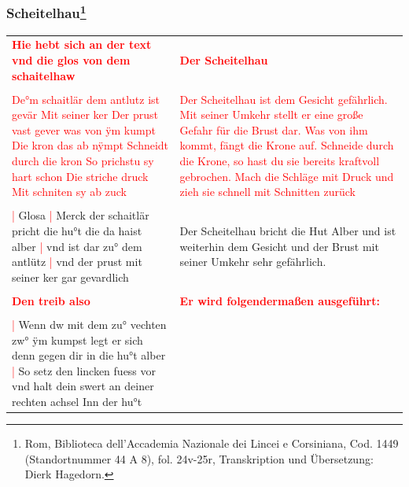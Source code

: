 \begin{center}
\end{center}

\newpage

\subsubsection[Scheitelhau]{
    Scheitelhau\footnote{
        \hspace*{0.5ex}Rom, Biblioteca dell'Accademia Nazionale dei Lincei e Corsiniana,
        Cod. 1449 (Standortnummer 44 A 8), fol. 24v-25r, Transkription und Übersetzung: Dierk Hagedorn.}}

\begin{longtable}{p{6.25cm}p{6.25cm}}
    \textbf{\textcolor{red}{
        Hie hebt sich an der text vnd die glos von dem schaitelhaw}}
    &
    \textbf{\textcolor{red}{
        Der Scheitelhau}}
    \\
    \\
    \textcolor{red}{
        De°m schaitlär dem antlutz ist gevär
        Mit seiner ker Der prust vast gever
        was von ÿm kumpt Die kron das ab nÿmpt
        Schneidt durch die kron So prichstu sy hart schon
        Die striche druck Mit schniten sy ab zuck}
    &
    \textcolor{red}{
        Der Scheitelhau ist dem Gesicht gefährlich.
        Mit seiner Umkehr stellt er eine große Gefahr für die Brust dar.
        Was von ihm kommt, fängt die Krone auf.
        Schneide durch die Krone, so hast du sie bereits kraftvoll gebrochen.
        Mach die Schläge mit Druck und zieh sie schnell mit Schnitten zurück}
    \\
    \\
    \textcolor{red}{|} Glosa
    \textcolor{red}{|} Merck der schaitlär pricht die hu°t die da haist alber
    \textcolor{red}{|} vnd ist dar zu° dem antlütz
    \textcolor{red}{|} vnd der prust mit seiner ker gar gevardlich
    &
    Der Scheitelhau bricht die Hut Alber und ist weiterhin dem Gesicht und der Brust mit seiner Umkehr sehr gefährlich.
    \\
    \\
    \textbf{\textcolor{red}{Den treib also}}
    &
    \textbf{\textcolor{red}{Er wird folgendermaßen ausgeführt:}}
    \\
    \\
    \textcolor{red}{|} Wenn dw mit dem zu° vechten zw° ÿm kumpst legt er sich denn gegen dir in die hu°t alber
    \textcolor{red}{|} So setz den lincken fuess vor vnd halt dein swert an deiner rechten achsel Inn der hu°t

\end{longtable}
